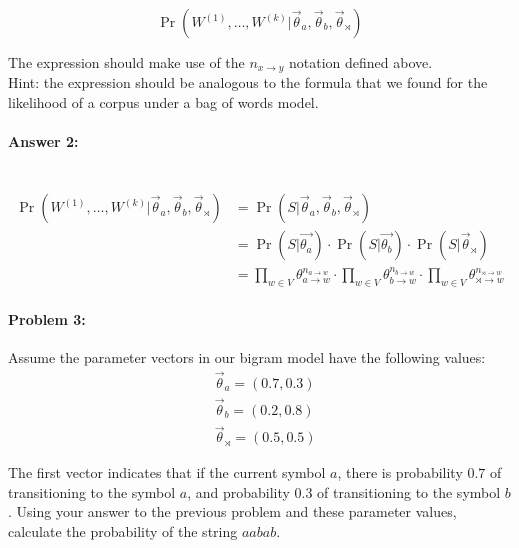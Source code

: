 \documentclass[12pt, letterpaper]{article}
\begin{document}
\begin{equation*}
\Pr(W^{(1)},\dots,W^{(k)} | \vec{\theta}_{a}, \vec{\theta}_{b}, \vec{\theta}_{\rtimes})
\end{equation*}

\noindent The expression should make use of the $n_{x \rightarrow y}$ notation
defined above.\\

\noindent Hint: the expression should be analogous to the formula that we found
for the likelihood of a corpus under a bag of words model.

\paragraph{Answer 2:}~\begin{align*}
    \Pr(W^{(1)},\dots,W^{(k)} | \vec{\theta}_{a}, \vec{\theta}_{b}, \vec{\theta}_{\rtimes}) &= \Pr(S|\vec{\theta}_{a}, \vec{\theta}_{b}, \vec{\theta}_{\rtimes})\\
    &= \Pr(S|\vec{\theta_a})\cdot{\Pr(S|\vec{\theta_b})\cdot{\Pr(S|\vec{\theta}_{\rtimes})}}\\
    &= \prod_{w\in V} \theta_{a \rightarrow w}^{n_{a \rightarrow w}}\cdot{\prod_{w\in V} \theta_{b \rightarrow w}^{n_{b \rightarrow w}}\cdot{\prod_{w\in V} \theta_{\rtimes \rightarrow w}^{n_{\rtimes \rightarrow w}}}}
\end{align*}

\hrulefill
\paragraph{Problem 3:}

Assume the parameter vectors in our bigram model have the following values:
\begin{align*}
&\vec{\theta}_{a} = (0.7,0.3)\\
&\vec{\theta}_{b} = (0.2,0.8)\\
&\vec{\theta}_{\rtimes} = (0.5,0.5)
\end{align*}

\noindent The first vector indicates that if the current symbol $a$,
there is probability $0.7$ of transitioning to the symbol $a$, and
probability $0.3$ of transitioning to the symbol $b$. Using your
answer to the previous problem and these parameter values, calculate
the probability of the string $aabab$.
\end{document}
